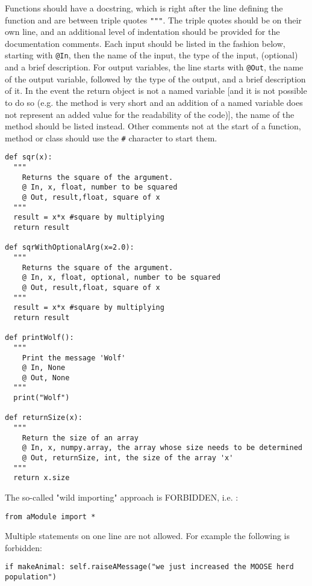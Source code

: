 \documentclass{article}
\begin{document}
Functions should have a ​docstring, which is right after the line
defining the function and are between triple quotes \verb'"""'. The
triple quotes should be on their own line, and an additional level of
indentation should be provided for the documentation comments. Each
input should be listed in the fashion below, starting with \verb'@In',
then the name of the input, the type of the input, (optional) and a
brief description. For output variables, the line starts with
\verb'@Out', the name of the output variable, followed by the type of
the output, and a brief description of it. In the event the return
object is not a named variable [and it is not possible to do so
  (e.g. the method is very short and an addition of a named variable
  does not represent an added value for the readability of the code)],
the name of the method should be listed instead. Other comments not at
the start of a function, method or class should use the \verb'#'
character to start them.

\begin{verbatim}
def sqr(x):
  """
    Returns the square of the argument.
    @ In, x, float, number to be squared
    @ Out, result,float, square of x
  """
  result = x*x #square by multiplying
  return result

def sqrWithOptionalArg(x=2.0):
  """
    Returns the square of the argument.
    @ In, x, float, optional, number to be squared
    @ Out, result,float, square of x
  """
  result = x*x #square by multiplying
  return result

def printWolf():
  """
    Print the message 'Wolf'
    @ In, None
    @ Out, None
  """
  print("Wolf")

def returnSize(x):
  """
    Return the size of an array
    @ In, x, numpy.array, the array whose size needs to be determined
    @ Out, returnSize, int, the size of the array 'x'
  """
  return x.size
\end{verbatim}

The so-called "wild importing" approach is FORBIDDEN, i.e. :

\begin{verbatim}
from aModule import *
\end{verbatim}

Multiple statements on one line are not allowed. For example the
following is forbidden:

\begin{verbatim}
if makeAnimal: self.raiseAMessage("we just increased the MOOSE herd population")
\end{verbatim}
\end{document}
